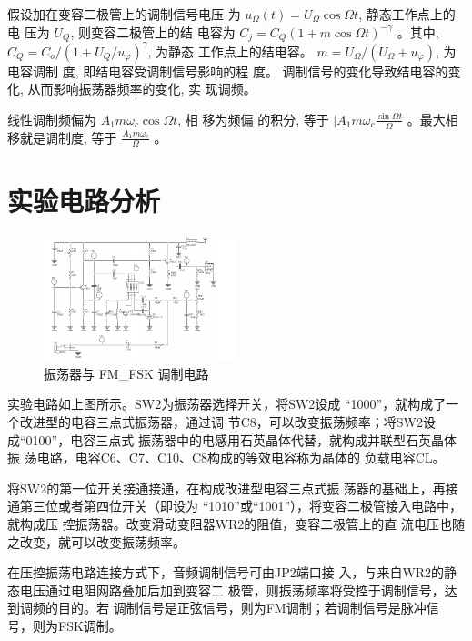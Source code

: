 \documentclass{../source/Experiment}
\begin{document}
        假设加在变容二极管上的调制信号电压
        为 $u_{\Omega}(t)=U_{\Omega} 
        \cos \Omega t$, 静态工作点上的电
        压为 $U_{Q}$, 则变容二极管上的结
        电容为 $C_{j}=C_{Q}(1+m \cos 
        \Omega t)^{-\gamma}$ 。其中, 
        $C_{Q}=C_{o} /\left(1+U_{Q} / 
        u_{\varphi}\right)^{\gamma}$, 
        为静态 工作点上的结电容。 $m=U_
        {\Omega} /\left(U_{\Omega}+u_
        {\varphi}\right)$, 为电容调制
        度, 即结电容受调制信号影响的程
        度。 调制信号的变化导致结电容的变
        化, 从而影响振荡器频率的变化, 实
        现调频。
       
        线性调制频偏为 $A_{1} m \omega_
        {c} \cos \Omega t$, 相 移为频偏
        的积分, 等于 $\mid A_{1} m 
        \omega_{c} \frac{\sin \Omega t}{\Omega}$ 。最大相移就是调制度, 等于 $\frac{A_{1} m \omega_{c}}{\Omega}$ 。
    \section{实验电路分析}
    \begin{figure}[H]
        \centering
        \includegraphics[width = 0.5\textwidth]{lab3/7.png}
        \caption{振荡器与 FM\_FSK 调制电路}    
    \end{figure}
    实验电路如上图所示。SW2为振荡器选择开关，将SW2设成
    “1000”，就构成了一个改进型的电容三点式振荡器，通过调
    节C8，可以改变振荡频率；将SW2设成“0100”，电容三点式
    振荡器中的电感用石英晶体代替，就构成并联型石英晶体振
    荡电路，电容C6、C7、C10、C8构成的等效电容称为晶体的
    负载电容CL。

    将SW2的第一位开关接通接通，在构成改进型电容三点式振
    荡器的基础上，再接通第三位或者第四位开关（即设为
    “1010”或“1001”），将变容二极管接入电路中，就构成压
    控振荡器。改变滑动变阻器WR2的阻值，变容二极管上的直
    流电压也随之改变，就可以改变振荡频率。

    在压控振荡电路连接方式下，音频调制信号可由JP2端口接
    入，与来自WR2的静态电压通过电阻网路叠加后加到变容二
    极管，则振荡频率将受控于调制信号，达到调频的目的。若
    调制信号是正弦信号，则为FM调制；若调制信号是脉冲信
    号，则为FSK调制。
\end{document}
